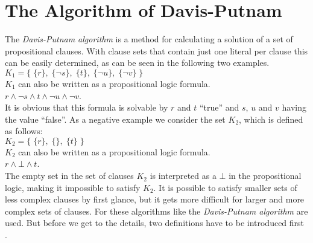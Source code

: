 \section{The Algorithm of Davis-Putnam}
\label{sec:sciDavisPutnam}
The \textit{Davis-Putnam algorithm} is a method for calculating a solution of a set of propositional clauses. With clause sets that contain just one literal per clause this can be easily determined, as can be seen in the following two examples.
\\[0.2cm]
\hspace*{1.3cm} $K_1 = \bigl\{\; \{r\},\; \{\neg s\},\; \{t\},\; \{\neg u\}, \; \{\neg v\} \;\bigr\}$ 
\\[0.2cm]
$K_1$ can also be written as a propositional logic formula.
\\[0.2cm]
\hspace*{1.3cm} $r \land \neg s \land t \land \neg u \land \neg v$.
\\[0.2cm]
It is obvious that this formula is solvable by $r$ and $t$ \enquote{true} and $s$, $u$ and $v$ having the value \enquote{false}.
As a negative example we consider the set $K_2$, which is defined as follows:
\\[0.2cm]
\hspace*{1.3cm} $K_2 = \bigl\{\; \{r\},\; \{\},\; \{t\} \;\bigr\}$
\\[0.2cm]
$K_2$ can also be written as a propositional logic formula.
\\[0.2cm]
\hspace*{1.3cm}
$r \land \bot \land t$.
\\[0.2cm]
The empty set in the set of clauses $K_2$ is interpreted as a $\bot$ in the propositional logic, making it impossible to satisfy $K_2$. It is possible to satisfy smaller sets of less complex clauses by first glance, but it gets more difficult for larger and more complex sets of clauses. For these algorithms like the \textit{Davis-Putnam algorithm} are used. But before we get to the details, two definitions have to be introduced first \cite{Zhang2000}. 

